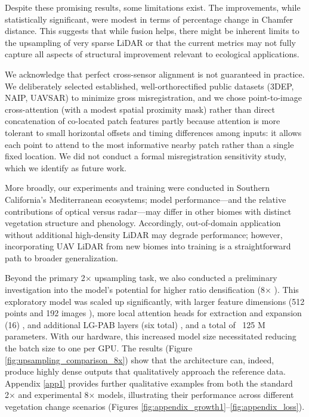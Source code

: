 \documentclass[remotesensing,article,accept,pdftex,moreauthors]{Definitions/mdpi}
\begin{document}
Despite these promising results, some limitations exist. The improvements, while statistically significant, were modest in terms of percentage change in Chamfer distance. This suggests that while fusion helps, there might be inherent limits to the upsampling of very sparse LiDAR or that the current metrics may not fully capture all aspects of structural improvement relevant to ecological applications.

We acknowledge that perfect cross-sensor alignment is not guaranteed in practice. We deliberately selected established, well-orthorectified public datasets (3DEP, NAIP, UAVSAR) to minimize gross misregistration, and we chose point-to-image cross-attention (with a modest spatial proximity mask) rather than direct concatenation of co-located patch features partly because attention is more tolerant to small horizontal offsets and timing differences among inputs: it allows each point to attend to the most informative nearby patch rather than a single fixed location. We did not conduct a formal misregistration sensitivity study, which we identify as future work.

More broadly, our experiments and training were conducted in Southern California's Mediterranean ecosystems; model performance—and the relative contributions of optical versus radar—may differ in other biomes with distinct vegetation structure and phenology. Accordingly, out-of-domain application without additional high-density LiDAR may degrade performance; however, incorporating UAV LiDAR from new biomes into training is a straightforward path to broader generalization.

Beyond the primary 2× upsampling task, we also conducted a preliminary investigation into the model's potential for higher ratio densification (8×
). This exploratory model was scaled up significantly, with larger feature dimensions (512 points and 192 images%
), more local attention heads for extraction and expansion (16)%
 , and additional LG-PAB layers (six total)
, and a total of ~125 M parameters. With our hardware, this increased model size necessitated reducing the batch size to one per GPU. The results (Figure \ref{fig:upsampling_comparison_8x}) show that the architecture can, indeed, produce highly dense outputs that qualitatively approach the reference data. Appendix \ref{app1} provides further qualitative examples from both the standard 2×
 and experimental 8× models, illustrating their performance across different vegetation change scenarios (Figures \ref{fig:appendix_growth1}--\ref{fig:appendix_loss}).
\end{document}
